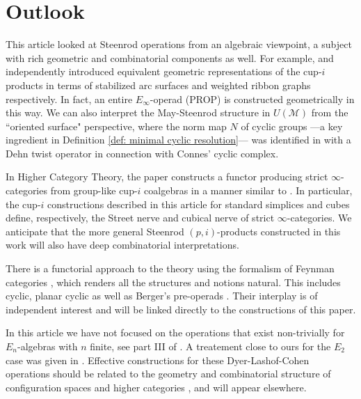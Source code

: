 
\section{Outlook}

This article looked at Steenrod operations from an algebraic viewpoint, a subject with rich geometric and combinatorial components as well. For example, \cite{Postnikov} and \cite{medina2018prop2} independently introduced equivalent geometric representations of the cup-$i$ products in terms of stabilized arc surfaces \cite{KLP} and weighted ribbon graphs respectively. In fact, an entire $E_\infty$-operad (PROP) is constructed geometrically in this way. We can also interpret the May-Steenrod structure in $U(\mathcal M)$ from the ``oriented surface" perspective, where the norm map $N$ of cyclic groups ---a key ingredient in Definition \ref{def: minimal cyclic resolution}--- was identified in \cite{KLP} with a Dehn twist operator in connection with Connes' cyclic complex.

In Higher Category Theory, the paper \cite{medina2020globular} constructs a functor producing strict \mbox{$\infty$-cat}egories from group-like cup-$i$ coalgebras in a manner similar to \cite{steiner2004omega}. In particular, the cup-$i$ constructions described in this article for standard simplices and cubes define, respectively, the Street nerve and cubical nerve of strict $\infty$-categories. We anticipate that the more general Steenrod $(p,i)$-products constructed in this work will also have deep combinatorial interpretations.

There is a functorial approach to the theory using the formalism of Feynman categories \cite{feynman},
which renders all the structures and notions natural. This includes cyclic, planar cyclic as well as Berger's pre-operads \cite{BergerRecog}. Their interplay is of independent interest \cite{BergerKaufmann,feyrep} and will be linked directly to the constructions of this paper.

In this article we have not focused on the operations that exist non-trivially for \mbox{$E_n$-algebras} with $n$ finite, see part III of \cite{may76homology}. A treatement close to ours for the $E_2$ case was given in \cite{Tourtchine}. Effective constructions for these Dyer-Lashof-Cohen operations should be related to the geometry and combinatorial structure of configuration spaces \cite{KZhang,sinha2013littledisks,berger04combinatorial,ayala2014configuration} and higher categories \cite{Bathigher, BalFiedSchwVogt, Rezkhigher}, and will appear elsewhere.

